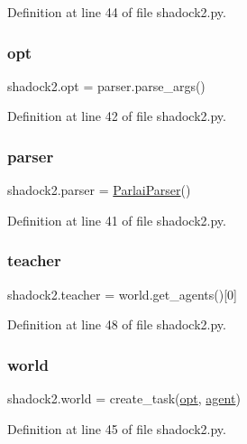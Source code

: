 Definition at line 44 of file shadock2.\+py.

\mbox{\label{namespaceshadock2_ac16afc5d0983dc9d7e5608d98ef9c8cd}} 
\subsubsection{\texorpdfstring{opt}{opt}}
{\footnotesize\ttfamily shadock2.\+opt = parser.\+parse\+\_\+args()}



Definition at line 42 of file shadock2.\+py.

\mbox{\label{namespaceshadock2_a89dd1b082837e937b1dacacec493a269}} 
\subsubsection{\texorpdfstring{parser}{parser}}
{\footnotesize\ttfamily shadock2.\+parser = \hyperlink{classparlai_1_1core_1_1params_1_1ParlaiParser}{Parlai\+Parser}()}



Definition at line 41 of file shadock2.\+py.

\mbox{\label{namespaceshadock2_a8f51abf464ce9479012a1e3b3a64668e}} 
\subsubsection{\texorpdfstring{teacher}{teacher}}
{\footnotesize\ttfamily shadock2.\+teacher = world.\+get\+\_\+agents()\mbox{[}0\mbox{]}}



Definition at line 48 of file shadock2.\+py.

\mbox{\label{namespaceshadock2_a3165bdff07a55337c2686e7c56b394e4}} 
\subsubsection{\texorpdfstring{world}{world}}
{\footnotesize\ttfamily shadock2.\+world = create\+\_\+task(\hyperlink{namespaceshadock2_ac16afc5d0983dc9d7e5608d98ef9c8cd}{opt}, \hyperlink{namespaceshadock2_a143910b54855edb0a70ffc547d2eb8d7}{agent})}



Definition at line 45 of file shadock2.\+py.

